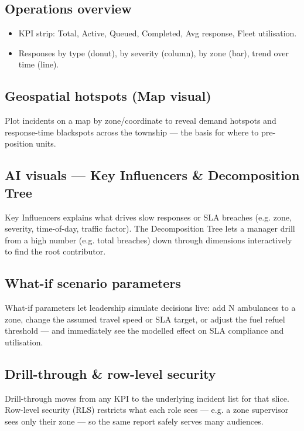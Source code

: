 \documentclass[11pt,a4paper]{article}
\begin{document}
\subsection{Operations overview}
\begin{itemize}[leftmargin=1.2em]
  \item KPI strip: Total, Active, Queued, Completed, Avg response, Fleet utilisation.
  \item Responses by type (donut), by severity (column), by zone (bar), trend over time (line).
\end{itemize}

\subsection{Geospatial hotspots (Map visual)}
Plot incidents on a map by zone/coordinate to reveal demand hotspots and response-time
blackspots across the township --- the basis for where to pre-position units.

\subsection{AI visuals --- Key Influencers \& Decomposition Tree}
Key Influencers explains what drives slow responses or SLA breaches (e.g. zone, severity,
time-of-day, traffic factor). The Decomposition Tree lets a manager drill from a high number
(e.g. total breaches) down through dimensions interactively to find the root contributor.

\subsection{What-if scenario parameters}
What-if parameters let leadership simulate decisions live: add N ambulances to a zone, change
the assumed travel speed or SLA target, or adjust the fuel refuel threshold --- and immediately
see the modelled effect on SLA compliance and utilisation.

\subsection{Drill-through \& row-level security}
Drill-through moves from any KPI to the underlying incident list for that slice. Row-level
security (RLS) restricts what each role sees --- e.g. a zone supervisor sees only their zone ---
so the same report safely serves many audiences.

\end{document}
